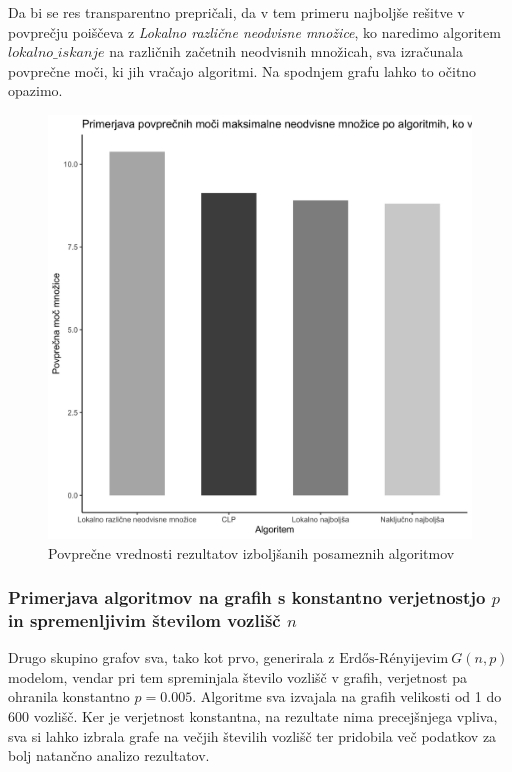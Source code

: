 \documentclass[a4paper, 12pt]{article}
\begin{document}
\noindent Da bi se res transparentno prepričali, da v tem primeru najboljše rešitve v povprečju poiščeva z \textit{Lokalno različne neodvisne množice}, ko naredimo algoritem $lokalno\_iskanje$
na različnih začetnih neodvisnih množicah, sva izračunala povprečne moči, ki jih vračajo algoritmi. Na spodnjem grafu lahko to očitno opazimo.
\begin{figure}[h!]
	\begin{center}
		\includegraphics[scale=0.12]{R_koda/pon-povpmoc-maxi.png}
		\caption{Povprečne vrednosti rezultatov izboljšanih posameznih algoritmov}
	\end{center}
\end{figure}


\subsubsection{Primerjava algoritmov na grafih s konstantno verjetnostjo $p$ in spremenljivim številom vozlišč $n$}

Drugo skupino grafov sva, tako kot prvo, generirala z $\text{Erdős-Rényijevim}\ G(n, p)$ modelom, vendar pri tem spreminjala število vozlišč v grafih, verjetnost pa ohranila konstantno $p=0.005$.
Algoritme sva izvajala na grafih velikosti od 1 do 600 vozlišč. Ker je verjetnost konstantna, na rezultate nima precejšnjega vpliva, sva si lahko izbrala grafe na večjih številih vozlišč ter pridobila več podatkov za bolj natančno analizo rezultatov.\\
\end{document}
